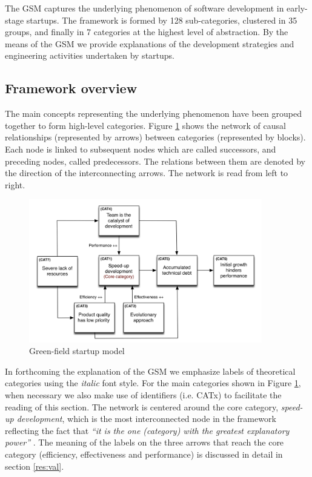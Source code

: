\documentclass[10pt,journal,letterpaper,compsoc]{IEEEtran}
\begin{document}
The GSM captures the underlying phenomenon of software development in 
early-stage startups. The framework is formed by 128 sub-categories, clustered 
in 35 groups, and finally in 7 categories at the highest level of abstraction. 
By the means of the GSM we provide explanations of the development strategies 
and engineering activities undertaken by startups.
\subsection{Framework overview}
\label{res:gsm:frmov}
The main concepts representing the underlying phenomenon have been grouped 
together to form high-level categories. Figure \ref{fig:gsm} shows the network 
of causal relationships (represented by arrows) between categories (represented 
by blocks). Each node is linked to subsequent nodes which are called successors, 
and preceding nodes, called predecessors. The relations between them are denoted 
by the direction of the interconnecting arrows. The network is read from left to 
right.

\begin{figure}[!t]
\centering
\includegraphics[width=4in]{figures/high-level}
\caption{Green-field startup model}\label{fig:gsm}
\end{figure}

In forthcoming the explanation of the GSM we emphasize labels of theoretical 
categories using the \textit{italic} font style. For the main categories shown 
in Figure \ref{fig:gsm}, when necessary we also make use of identifiers (i.e. 
CATx) to facilitate the reading of this section.
The network is centered around the core category, \textit{speed-up 
development}, which is the most interconnected node in the framework reflecting 
the fact that \textit{``it is the one (category) with the greatest explanatory 
power''}  \cite{Strauss1998}. The meaning of the labels on the three arrows that 
reach the core category (efficiency, effectiveness and performance) is discussed 
in detail in section \ref{res:val}. %
\end{document}
